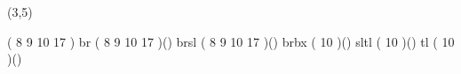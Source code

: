 %
%
%
%
%
%
%

\lhvercheck(3,5)

%
\MakeFileHeadstrue %
     \tablevalues                   ( 8 9 10 17 )
     \makefont \fonttwoletters br   ( 8 9 10 17 )()
     \makefont \fonttwoletters brsl ( 8 9 10 17 )()
     \makefont \fonttwoletters brbx (     10    )()
     \makefont \fonttwoletters sltl (     10    )()
     \makefont \fonttwoletters tl   (     10    )()
\endinput
